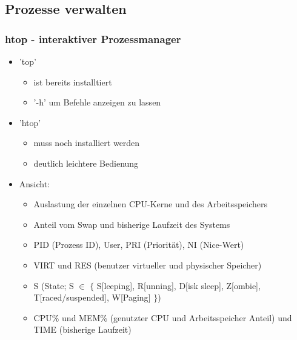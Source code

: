\documentclass[12pt,utf8, handout]{beamer}
\begin{document}
\subsection{Prozesse verwalten}
\begin{frame}
\frametitle{htop - interaktiver Prozessmanager}
\begin{itemize}
	\item 'top'
	\begin{itemize}[<+->]
		\item ist bereits installtiert
		\item '-h' um Befehle anzeigen zu lassen
	\end{itemize}
	\item 'htop'
	\begin{itemize}[<+->]
		\item muss noch installiert werden
		\item deutlich leichtere Bedienung
	\end{itemize}
	\item Ansicht:
	\begin{itemize}[<+->]
		\item Auslastung der einzelnen CPU-Kerne und des Arbeitsspeichers
		\item Anteil vom Swap und bisherige Laufzeit des Systems
		\item PID (Prozess ID), User, PRI (Priorität), NI (Nice-Wert)
		\item VIRT und RES (benutzer virtueller und physischer Speicher)
		\item S (State; S $\in$ $\{$ S[leeping], R[unning], D[isk sleep], Z[ombie], T[raced/suspended], W[Paging] $\}$)
		\item CPU$\%$ und MEM$\%$ (genutzter CPU und Arbeitsspeicher Anteil) und TIME (bisherige Laufzeit)
	\end{itemize}
\end{itemize}
\end{frame}
\end{document}
